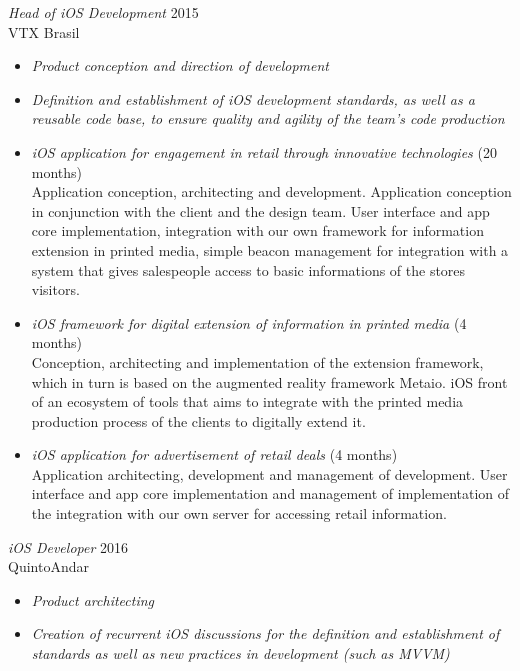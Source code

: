 \documentclass[]{res} %
\newcommand{\sbt}{\,\begin{picture}(-1,1)(-2,-3)\circle*{2}\end{picture}\ }
\def \myitemback{0.55cm}
\def \myitemsep{0pt}
\def \mypositionface{\sl}
\def \myorgface{\sc}
\newif\ifgames
\begin{document}
\begin{resume}
    {\mypositionface Head of iOS Development} \hfill 2015\\
    {\myorgface VTX Brasil}

    \begin{itemize}[itemsep=\myitemsep,leftmargin=\myitemback]
    \item[\sbt] {\it Product conception and direction of development}
    \item[\sbt] {\it Definition and establishment of iOS development standards, as well as a reusable code base, to ensure quality and agility of the team's code production}

    \ifgames
        \vfill
    \else
    \fi

    \item[\sbt] {\it iOS application for engagement in retail through innovative technologies} \hfill (20 months)\\
    Application conception, architecting and development. Application conception in conjunction with the client and the design team. User interface and app core implementation, integration with our own framework for information extension in printed media, simple beacon management for integration with a system that gives salespeople access to basic informations of the stores visitors.
    \item[\sbt] {\it iOS framework for digital extension of information in printed media} \hfill (4 months)\\
    Conception, architecting and implementation of the extension framework, which in turn is based on the augmented reality framework Metaio. iOS front of an ecosystem of tools that aims to integrate with the printed media production process of the clients to digitally extend it.
    
    \ifgames
    \else
        \vfill
    \fi

    \item[\sbt] {\it iOS application for advertisement of retail deals} \hfill (4 months)\\
    Application architecting, development and management of development. User interface and app core implementation and management of implementation of the integration with our own server for accessing retail information.
    \end{itemize}
    
    {\mypositionface iOS Developer} \hfill 2016\\
    {\myorgface QuintoAndar}

    \begin{itemize}[itemsep=\myitemsep,leftmargin=\myitemback]
    \item[\sbt] {\it Product architecting}
    \item[\sbt] {\it Creation of recurrent iOS discussions for the definition and establishment of standards as well as new practices in development (such as MVVM)}


\end{itemize}
\end{resume}
\end{document}
